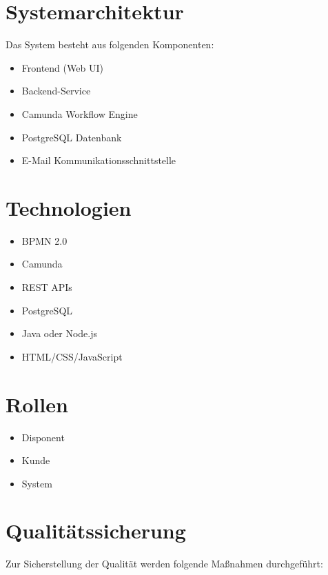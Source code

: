 \documentclass[12pt,a4paper]{article}
\begin{document}
\section{Systemarchitektur}

Das System besteht aus folgenden Komponenten:

\begin{itemize}
    \item Frontend (Web UI)
    \item Backend-Service
    \item Camunda Workflow Engine
    \item PostgreSQL Datenbank
    \item E-Mail Kommunikationsschnittstelle
\end{itemize}

\section{Technologien}

\begin{itemize}
    \item BPMN 2.0
    \item Camunda
    \item REST APIs
    \item PostgreSQL
    \item Java oder Node.js
    \item HTML/CSS/JavaScript
\end{itemize}

\section{Rollen}

\begin{itemize}
    \item Disponent
    \item Kunde
    \item System
\end{itemize}

\section{Qualitätssicherung}

Zur Sicherstellung der Qualität werden folgende Maßnahmen durchgeführt:
\end{document}
